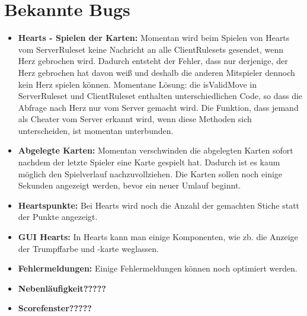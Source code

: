 \documentclass{article}
\begin{document}
\section{Bekannte Bugs}
\begin{itemize}
	\item \textbf{Hearts - Spielen der Karten:} Momentan wird beim Spielen von Hearts vom ServerRuleset keine Nachricht an alle ClientRulesets gesendet, wenn Herz gebrochen wird. Dadurch entsteht der Fehler, dass nur derjenige, der Herz gebrochen hat davon weiß und deshalb die anderen Mitspieler dennoch kein Herz spielen können. Momentane Lösung: die isValidMove in ServerRuleset und ClientRuleset enthalten unterschiedlichen Code, so dass die Abfrage nach Herz nur vom Server gemacht wird. Die Funktion, dass jemand als Cheater vom Server erkannt wird, wenn diese Methoden sich unterscheiden, ist momentan unterbunden.\\
	\item \textbf{Abgelegte Karten:} Momentan verschwinden die abgelegten Karten sofort nachdem der letzte Spieler eine Karte gespielt hat. Dadurch ist es kaum möglich den Spielverlauf nachzuvollziehen. Die Karten sollen noch einige Sekunden angezeigt werden, bevor ein neuer Umlauf beginnt. \\
	\item \textbf{Heartspunkte:} Bei Hearts wird noch die Anzahl der gemachten Stiche statt der Punkte angezeigt. \\
	\item \textbf{GUI Hearts:} In Hearts kann man einige Komponenten, wie zb. die Anzeige der Trumpffarbe und -karte weglassen. \\
	\item \textbf{Fehlermeldungen:} Einige Fehlermeldungen können noch optimiert werden. \\
	\item \textbf{Nebenläufigkeit?????}  \\
	\item \textbf{Scorefenster?????}  \\
\end{itemize}
\end{document}
